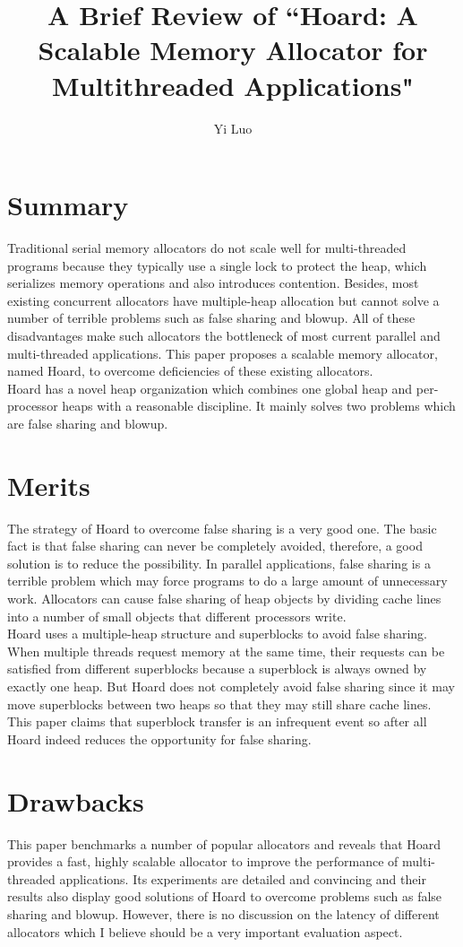 \documentclass[10pt, letterpaper]{article}
\title{A Brief Review of ``Hoard: A Scalable Memory Allocator for Multithreaded Applications"}
\author{Yi Luo}
\date{} %
\begin{document}
\maketitle

\section{Summary}
\label{sec-summary}
 Traditional serial memory allocators do not scale well for multi-threaded programs because they typically use a single lock to protect the heap, which serializes memory operations and also introduces contention. Besides, most existing concurrent allocators have multiple-heap allocation but cannot solve a number of terrible problems such as false sharing and blowup. All of these disadvantages make such allocators the bottleneck of most current parallel and multi-threaded applications. This paper proposes a scalable memory allocator, named Hoard, to overcome deficiencies of these existing allocators.
\\Hoard has a novel heap organization which combines one global heap and per-processor heaps with a reasonable discipline. It mainly solves two problems which are false sharing and blowup.
~\cite{emery2000Hoard}

\section{Merits}
\label{sec-merits}
The strategy of Hoard to overcome false sharing is a very good one. The basic fact is that false sharing can never be completely avoided, therefore, a good solution is to reduce the possibility. In parallel applications, false sharing is a terrible problem which may force programs to do a large amount of unnecessary work. Allocators can cause false sharing of heap objects by dividing cache lines into a number of small objects that different processors write.
\\Hoard uses a multiple-heap structure and superblocks to avoid false sharing. When multiple threads request memory at the same time, their requests can be satisfied from different superblocks because a superblock is always owned by exactly one heap. But Hoard does not completely avoid false sharing since it may move superblocks between two heaps so that they may still share cache lines. This paper claims that superblock transfer is an infrequent event so after all Hoard indeed reduces the opportunity for false sharing.

\section{Drawbacks}
\label{sec-drawbacks}
This paper benchmarks a number of popular allocators and reveals that Hoard provides a fast, highly scalable allocator to improve the performance of multi-threaded applications. Its experiments are detailed and convincing and their results also display good solutions of Hoard to overcome problems such as false sharing and blowup. However, there is no discussion on the latency of different allocators which I believe should be a very important evaluation aspect.
\end{document}
